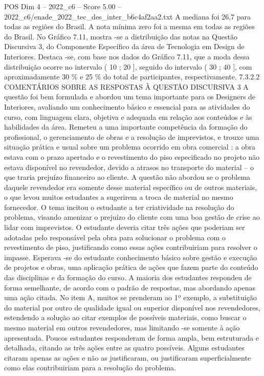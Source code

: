 \begin{textsample}{POS Dim 4 – 2022\_c6 – Score 5.00 – 2022\_c6/enade\_2022\_tec\_des\_inter\_b6c4af2aa2.txt}
A mediana foi 26,7 para todas as regiões do Brasil.
A nota mínima zero foi a mesma em todas as regiões do Brasil.
No Gráfico 7.11, mostra -se a distribuição das notas na Questão Discursiva 3, do Componente Específico da área de Tecnologia em Design de Interiores.
Destaca -se, com base nos dados do Gráfico 7.11, que a moda dessa distribuição ocorre no intervalo ( 10 ; 20 ], seguido do intervalo ( 30 ; 40 ], com aproximadamente 30 \% e 25 \% do total de participantes, respectivamente. 7.3.2.2 COMENTÁRIOS SOBRE AS RESPOSTAS À QUESTÃO DISCURSIVA 3 A questão foi bem formulada e abordou um tema importante para os Designers de Interiores, avaliando um conhecimento básico e essencial para as atividades do curso, com linguagem clara, objetiva e adequada em relação aos conteúdos e às habilidades da área.
Remeteu a uma importante competência da formação do profissional, o gerenciamento de obras e a resolução de imprevistos, e trouxe uma situação prática e usual sobre um problema ocorrido em obra comercial : a obra estava com o prazo apertado e o revestimento do piso especificado no projeto não estava disponível no revendedor, devido a atrasos no transporte do material – o que traria prejuízo financeiro ao cliente.
A questão não abordou se o problema daquele revendedor era somente desse material específico ou de outros materiais, o que levou muitos estudantes a sugerirem a troca de material no mesmo fornecedor.
O tema incitou o estudante a ter criatividade na resolução do problema, visando amenizar o prejuízo do cliente com uma boa gestão de crise ao lidar com imprevistos.
O estudante deveria citar três ações que poderiam ser adotadas pelo responsável pela obra para solucionar o problema com o revestimento de piso, justificando como essas ações contribuiriam para resolver o impasse.
Esperava -se do estudante conhecimento básico sobre gestão e execução de projetos e obras, uma aplicação prática de ações que fazem parte do conteúdo das disciplinas e da formação do curso.
A maioria dos estudantes respondeu de forma semelhante, de acordo com o padrão de respostas, mas abordando apenas uma ação citada.
No item A, muitos se prenderam ao 1º exemplo, a substituição do material por outro de qualidade igual ou superior disponível nos revendedores, estendendo a solução ao citar exemplos de possíveis materiais, como buscar o mesmo material em outros revendedores, mas limitando -se somente à ação apresentada.
Poucos estudantes responderam de forma ampla, bem estruturada e detalhada, citando as três ações entre as quatro possíveis.
Alguns estudantes citaram apenas as ações e não as justificaram, ou justificaram superficialmente como elas contribuiriam para a resolução do problema.

\end{textsample}
